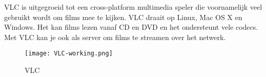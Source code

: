 VLC is uitgegroeid tot een cross-platform multimedia speler die voornamelijk veel gebruikt wordt om films mee te kijken. VLC draait op Linux, Mac OS X en Windows. Het kan films lezen vanaf CD en DVD en het ondersteunt vele codecs. Met VLC kan je ook als server om films te streamen over het netwerk.

\begin{center}
\begin{figure}[H]
\texttt{[image: VLC-working.png]}
\caption{VLC}
\end{figure}
\end{center}

